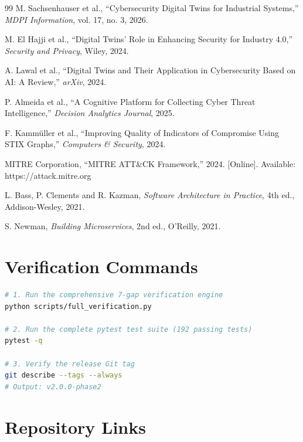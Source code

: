 \documentclass[12pt,a4paper]{amritareport}
\begin{document}
\begin{thebibliography}{99}
M. Sachsenhauser et al., ``Cybersecurity Digital Twins for Industrial Systems,'' \textit{MDPI Information}, vol. 17, no. 3, 2026.

M. El Hajji et al., ``Digital Twins' Role in Enhancing Security for Industry 4.0,'' \textit{Security and Privacy}, Wiley, 2024.

A. Lawal et al., ``Digital Twins and Their Application in Cybersecurity Based on AI: A Review,'' \textit{arXiv}, 2024.

P. Almeida et al., ``A Cognitive Platform for Collecting Cyber Threat Intelligence,'' \textit{Decision Analytics Journal}, 2025.

F. Kamm\"uller et al., ``Improving Quality of Indicators of Compromise Using STIX Graphs,'' \textit{Computers \& Security}, 2024.

MITRE Corporation, ``MITRE ATT\&CK Framework,'' 2024. [Online]. Available: https://attack.mitre.org

L. Bass, P. Clements and R. Kazman, \textit{Software Architecture in Practice}, 4th ed., Addison-Wesley, 2021.

S. Newman, \textit{Building Microservices}, 2nd ed., O'Reilly, 2021.

\end{thebibliography}

\appendix

\chapter{Verification Commands}

\begin{lstlisting}[language=bash, caption={7-gap verification}]
# 1. Run the comprehensive 7-gap verification engine
python scripts/full_verification.py

# 2. Run the complete pytest test suite (192 passing tests)
pytest -q

# 3. Verify the release Git tag
git describe --tags --always
# Output: v2.0.0-phase2
\end{lstlisting}

\chapter{Repository Links}
\end{document}
